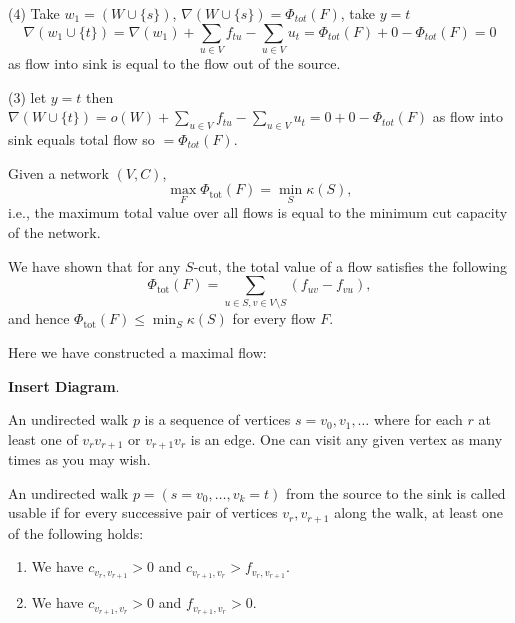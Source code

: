 \documentclass[10pt, a4paper]{article}
\begin{document}
\begin{example}
\begin{solution}
\begin{enumerate}[label = (\roman*)]
            ($4$)
            Take $w_1 = (W \cup \{s\})$,
            $\nabla(W \cup \{s\}) = \Phi_{tot}(F)$,
            take $y = t$
            \[
            \nabla(w_1 \cup \{t\}) = \nabla(w_1) + \sum_{u \in V}f_{tu} - \sum_{u \in V}u_t = \Phi_{tot}(F) + 0 - \Phi_{tot}(F) = 0
            \]
            as flow into sink is equal to the flow out of the source.

            ($3$)
            let $y = t$ then $\nabla(W \cup \{t\}) = o(W) + \sum_{u \in V}f_{tu} - \sum_{u \in V}u_t = 0 + 0 - \Phi_{tot}(F)$ as flow into sink equals total flow so $=\Phi_{tot}(F)$.
        \end{enumerate}
    \end{solution}
\end{example}

\begin{theorem}
    Given a network $(V, C)$,
    \[
    \max_{F}\Phi_{\text{tot}}(F) = \min_{S}\kappa(S),
    \]
    i.e.,
    the maximum total value over all flows is equal to the minimum cut capacity of the network.
\end{theorem}

We have shown that for any $S$-cut,
the total value of a flow satisfies the following
\[
\Phi_{\text{tot}}(F) = \sum_{u \in S, v \in V \setminus S}(f_{uv} - f_{vu}),
\]
and hence $\Phi_{\text{tot}}(F) \leq \min_S\kappa(S)$ for every flow $F$.

\begin{example}
    Here we have constructed a maximal flow:
    
    \textbf{Insert Diagram}.

    
\end{example}

An undirected walk $p$ is a sequence of vertices $s = v_0, v_1, \dotsc$ where for each $r$ at least one of $v_rv_{r + 1}$ or $v_{r + 1}v_r$ is an edge.
One can visit any given vertex as many times as you may wish.

\begin{definition}
    An undirected walk $p = (s = v_0, \dotsc, v_k = t)$ from the source to the sink is called usable if for every successive pair of vertices $v_r, v_{r + 1}$ along the walk,
    at least one of the following holds:
    \begin{enumerate}[label = (\roman*)]
        \item We have $c_{v_r, v_{r + 1}} > 0$ and $c_{v_{r + 1}, v_r} > f_{v_r, v_{r + 1}}$.

        \item We have $c_{v_{r + 1}, v_r} > 0$ and $f_{v_{r + 1}, v_r} > 0$.
    \end{enumerate}
\end{definition}
\end{document}
